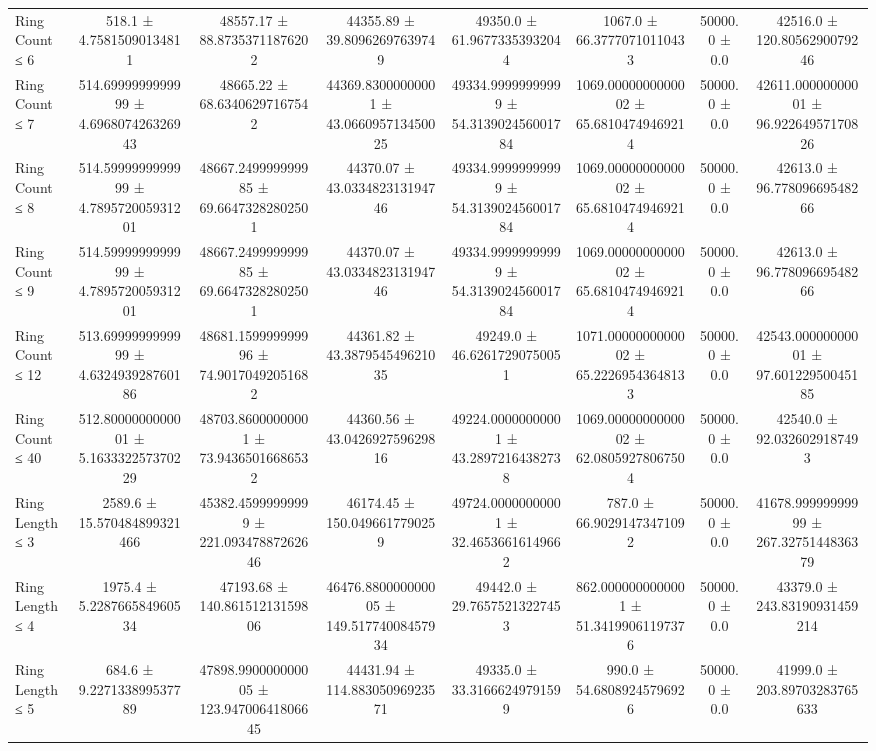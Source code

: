 \begin{table}[H]
\begin{tabular}{l c c c c c c c}
        Ring Count ≤ 6 & 518.1 ± 4.75815090134811 & 48557.17 ± 88.87353711876202 & 44355.89 ± 39.80962697639749 & 49350.0 ± 61.96773353932044 & 1067.0 ± 66.37770710110433 & 50000.0 ± 0.0 & 42516.0 ± 120.8056290079246 \\
        Ring Count ≤ 7 & 514.6999999999999 ± 4.696807426326943 & 48665.22 ± 68.63406297167542 & 44369.83000000001 ± 43.066095713450025 & 49334.99999999999 ± 54.313902456001784 & 1069.0000000000002 ± 65.68104749469214 & 50000.0 ± 0.0 & 42611.00000000001 ± 96.92264957170826 \\
        Ring Count ≤ 8 & 514.5999999999999 ± 4.789572005931201 & 48667.249999999985 ± 69.66473282802501 & 44370.07 ± 43.033482313194746 & 49334.99999999999 ± 54.313902456001784 & 1069.0000000000002 ± 65.68104749469214 & 50000.0 ± 0.0 & 42613.0 ± 96.77809669548266 \\
        Ring Count ≤ 9 & 514.5999999999999 ± 4.789572005931201 & 48667.249999999985 ± 69.66473282802501 & 44370.07 ± 43.033482313194746 & 49334.99999999999 ± 54.313902456001784 & 1069.0000000000002 ± 65.68104749469214 & 50000.0 ± 0.0 & 42613.0 ± 96.77809669548266 \\
        Ring Count ≤ 12 & 513.6999999999999 ± 4.632493928760186 & 48681.159999999996 ± 74.90170492051682 & 44361.82 ± 43.387954549621035 & 49249.0 ± 46.62617290750051 & 1071.0000000000002 ± 65.22269543648133 & 50000.0 ± 0.0 & 42543.00000000001 ± 97.60122950045185 \\
        Ring Count ≤ 40 & 512.8000000000001 ± 5.163332257370229 & 48703.86000000001 ± 73.94365016686532 & 44360.56 ± 43.042692759629816 & 49224.00000000001 ± 43.28972164382738 & 1069.0000000000002 ± 62.08059278067504 & 50000.0 ± 0.0 & 42540.0 ± 92.0326029187493 \\
        Ring Length ≤ 3 & 2589.6 ± 15.570484899321466 & 45382.45999999999 ± 221.09347887262646 & 46174.45 ± 150.0496617790259 & 49724.00000000001 ± 32.46536616149662 & 787.0 ± 66.90291473471092 & 50000.0 ± 0.0 & 41678.99999999999 ± 267.3275144836379 \\
        Ring Length ≤ 4 & 1975.4 ± 5.228766584960534 & 47193.68 ± 140.86151213159806 & 46476.880000000005 ± 149.51774008457934 & 49442.0 ± 29.76575213227453 & 862.0000000000001 ± 51.34199061197376 & 50000.0 ± 0.0 & 43379.0 ± 243.83190931459214 \\
        Ring Length ≤ 5 & 684.6 ± 9.227133899537789 & 47898.990000000005 ± 123.94700641806645 & 44431.94 ± 114.88305096923571 & 49335.0 ± 33.31666249791599 & 990.0 ± 54.68089245796926 & 50000.0 ± 0.0 & 41999.0 ± 203.89703283765633 \\

\end{tabular}
\end{table}
